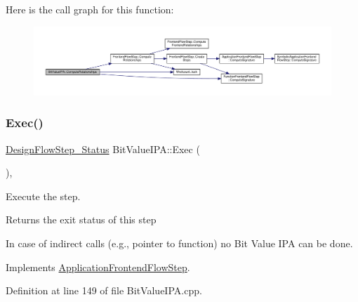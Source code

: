 Here is the call graph for this function\+:
\nopagebreak
\begin{figure}[H]
\begin{center}
\leavevmode
\includegraphics[width=350pt]{da/d6c/classBitValueIPA_a0599406c42da912fe0c0d768bf52e73a_cgraph}
\end{center}
\end{figure}
\mbox{\label{classBitValueIPA_a83d4228b39c126b0007701f32409a71c}} 
\subsubsection{\texorpdfstring{Exec()}{Exec()}}
{\footnotesize\ttfamily \hyperlink{design__flow__step_8hpp_afb1f0d73069c26076b8d31dbc8ebecdf}{Design\+Flow\+Step\+\_\+\+Status} Bit\+Value\+I\+P\+A\+::\+Exec (\begin{DoxyParamCaption}{ }\end{DoxyParamCaption})\hspace{0.3cm}{\ttfamily [override]}, {\ttfamily [virtual]}}



Execute the step. 

\begin{DoxyReturn}{Returns}
the exit status of this step 
\end{DoxyReturn}
In case of indirect calls (e.\+g., pointer to function) no Bit Value I\+PA can be done. 

Implements \hyperlink{classApplicationFrontendFlowStep_a2bf060a5ebc1735635dc5c7773387a25}{Application\+Frontend\+Flow\+Step}.



Definition at line 149 of file Bit\+Value\+I\+P\+A.\+cpp.



